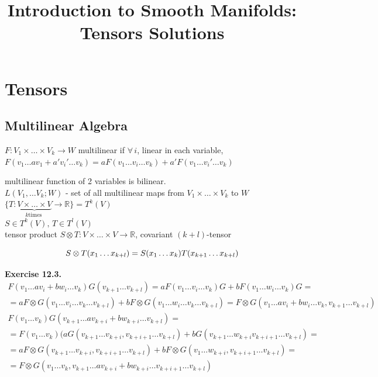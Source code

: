 \documentclass[11pt]{amsart}
\title{Introduction to Smooth Manifolds: Tensors Solutions}
\theoremstyle{definition}
\newcommand{\exercisehead}[1]{\medskip\noindent\textbf{Exercise #1.} }
\begin{document}
\maketitle
\section{Tensors}



\subsection*{ Multilinear Algebra }



$F: V_1 \times \dots \times V_k \to W$ multilinear if $\forall \, i$, linear in each variable, $F(v_1 \dots a v_1 + a' v_i' \dots v_k) = aF(v_1 \dots v_i \dots v_k) + a'F(v_1 \dots v_i' \dots v_k)$

multilinear function of 2 variables is bilinear.  \\

$L(V_1, \dots V_k; W)$ - set of all multilinear maps from $V_1 \times \dots \times V_k$ to $W$ \\

$\lbrace T: \underbrace{V\times \dots \times V}_{k \text{times }} \to \mathbb{R} \rbrace = T^k(V)$  \\

$S\in T^k(V), \, T\in T^l(V)$  \\
tensor product $S\otimes T: V \times \dots \times V \to \mathbb{R}$, covariant $(k+l)$-tensor

\[
  S \otimes T(x_1 \dots x_{k+l}) = S(x_1 \dots x_k) T(x_{k+1} \dots x_{k+l}) \\
\]

\exercisehead{12.3}
\[
\begin{gathered}
  F(v_1 \dots av_i + bw_i \dots v_k) G(v_{k+1} \dots v_{k+l}) = aF(v_1 \dots v_i \dots v_k) G + b F(v_1 \dots w_i \dots v_k)G = \\
  =  aF\otimes G(v_1 \dots v_i \dots v_k \dots v_{k+l}) + bF\otimes G(v_1 \dots w_i \dots v_k \dots v_{k+l}) = F\otimes G( v_1 \dots a v_i  + b w_i \dots v_k, v_{k+1} \dots v_{k+l} ) \\
    F(v_1 \dots v_k) G(v_{k+1} \dots av_{k+i} + bw_{k+i} \dots v_{k+l}) = \\
    = F(v_1 \dots v_k)(aG(v_{k+1} \dots v_{k+i}, v_{k+i +1} \dots v_{k+l} ) + bG(v_{k+1 } \dots w_{k+i} v_{k+i +1} \dots v_{k+l }) = \\
    = aF\otimes G(v_{k+1} \dots v_{k+i} , v_{k+i +1} \dots v_{k+l }) + bF\otimes G(v_1 \dots w_{k+i}, v_{k+i + 1} \dots v_{k+l} ) = \\
    = F\otimes G(v_1 \dots v_k, v_{k+1} \dots av_{k+i} + b w_{k+i} \dots v_{k+i +1} \dots v_{k+l })
\end{gathered}
\]
\end{document}
